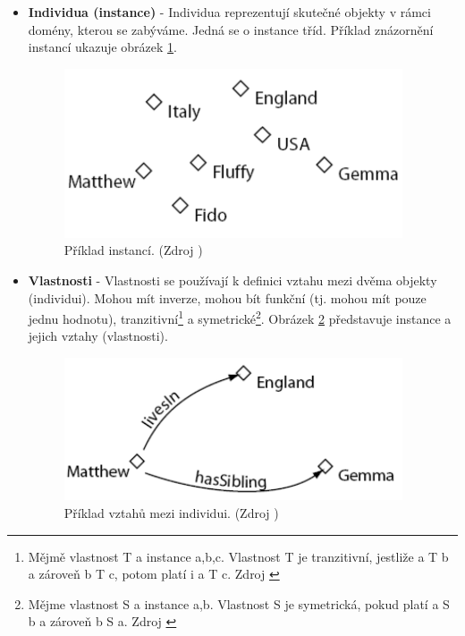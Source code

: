             \begin{itemize}
            \item \textbf{Individua (instance)} - Individua reprezentují skutečné objekty v rámci domény, kterou se zabýváme. Jedná se o instance tříd.
            Příklad znázornění instancí ukazuje obrázek \ref{img:individuals}.
            
            \begin{figure}[h]
            \begin{center}
            \includegraphics[width=10cm]{figures/individuals}
            \caption{Příklad instancí. (Zdroj \cite{owltutorial})}
            \label{img:individuals}
            \end{center}
            \end{figure}
            
            \item \textbf{Vlastnosti} - Vlastnosti se používají k definici vztahu mezi dvěma objekty (individui). Mohou mít inverze, mohou bít funkční (tj. mohou mít pouze jednu hodnotu), tranzitivní\footnote{Mějmě vlastnost T a instance a,b,c. Vlastnost T je tranzitivní, jestliže a T b a zároveň b T c, potom platí i a T c. Zdroj \cite{relace}} a symetrické\footnote{Mějme vlastnost S a instance a,b. Vlastnost S je symetrická, pokud platí a S b a zároveň b S a. Zdroj \cite{relace}}.
            Obrázek \ref{img:properties} představuje instance a jejich vztahy (vlastnosti).
            
            \begin{figure}[h]
            \begin{center}
            \includegraphics[width=10cm]{figures/relations}
            \caption{Příklad vztahů mezi individui. (Zdroj \cite{owltutorial})}
            \label{img:properties}
            \end{center}
            \end{figure}
            

\end{itemize}
